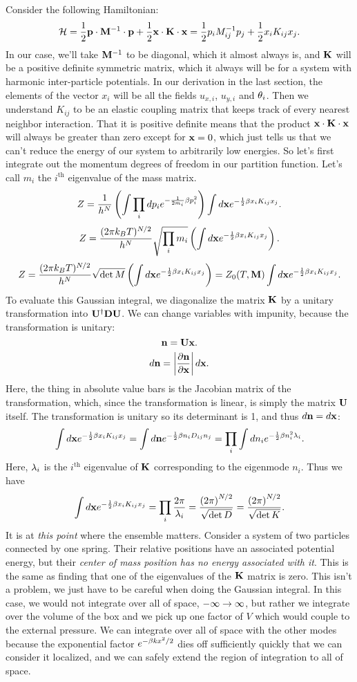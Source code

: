 \documentclass[12pt]{article}
\begin{document}
Consider the following Hamiltonian:
\[\mathcal{H} = \frac{1}{2} \mathbf{p} \cdot \mathbf{M} ^{-1} \cdot \mathbf{p} + \frac{1}{2} \mathbf{x} \cdot \mathbf{K} \cdot \mathbf{x} = \frac{1}{2}p_i M^{-1}_{ij} p_j + \frac{1}{2}x_i K_{ij}x_j.\]
In our case, we'll take $\mathbf{M}^{-1}$ to be diagonal, which it almost always is, and $\mathbf{K}$ will be a positive definite symmetric matrix, which it always will be for a system with harmonic inter-particle potentials. In our derivation in the last section, the elements of the vector $x_i$ will be all the fields $u_{x,i}$, $u_{y,i}$ and $\theta_i$. Then we understand $K_{ij}$ to be an elastic coupling matrix that keeps track of every nearest neighbor interaction. That it is positive definite means that the product $\mathbf{x} \cdot \mathbf{K} \cdot \mathbf{x}$ will always be greater than zero except for $\mathbf{x} = 0$, which just tells us that we can't reduce the energy of our system to arbitrarily low energies. So let's first integrate out the momentum degrees of freedom in our partition function. Let's call $m_i$ the $i^\mathrm{th}$ eigenvalue of the mass matrix.
\[ Z = \frac{1}{h^N} \left(\int \prod_idp_i e^{-\frac{1}{2m_i}\beta p_i^2}\right)\int d\mathbf{x} e^{-\frac{1}{2}\beta x_iK_{ij}x_j}.\]
\[ Z = \frac{(2\pi k_BT)^{N/2}}{h^N}\sqrt{\prod_i m_i} \left(\int d\mathbf{x} e^{-\frac{1}{2}\beta x_iK_{ij}x_j}\right).\]
\[ Z = \frac{(2\pi k_BT)^{N/2}}{h^N}\sqrt{\det M} \left(\int d\mathbf{x} e^{-\frac{1}{2}\beta x_iK_{ij}x_j}\right) = Z_0(T,\mathbf{M}) \int d\mathbf{x} e^{-\frac{1}{2}\beta x_iK_{ij}x_j}.\]
To evaluate this Gaussian integral, we diagonalize the matrix $\mathbf{K}$ by a unitary transformation into $\mathbf{U}^\dagger \mathbf{D} \mathbf{U}$. We can change variables with impunity, because the transformation is unitary:
\[ \mathbf{n} = \mathbf{U} \mathbf{x}.\]
\[ d\mathbf{n} = \left | \frac{\partial {\mathbf{n}}}{\partial {\mathbf{x}}} \right | d\mathbf{x}.\]
Here, the thing in absolute value bars is the Jacobian matrix of the transformation, which, since the transformation is linear, is simply the matrix $\mathbf{U}$ itself. The transformation is unitary so its determinant is 1, and thus $d\mathbf{n} = d\mathbf{x}$:
\[ \int d\mathbf{x} e^{-\frac{1}{2}\beta x_i K_{ij} x_j} = \int d\mathbf{n} e^{-\frac{1}{2}\beta n_i D_{ij} n_j} = \prod_i \int dn_i e^{-\frac{1}{2} \beta n_i^2 \lambda_i}.\]
Here, $\lambda_i$ is the $i^\mathrm{th}$ eigenvalue of $\mathbf{K}$ corresponding to the eigenmode $n_i$. Thus we have
\[ \int d\mathbf{x} e^{-\frac{1}{2}\beta x_i K_{ij} x_j} = \prod_i \frac{2\pi}{\lambda_i} = \frac{\left(2\pi\right)^{N/2}}{\sqrt{\det D}} = \frac{\left(2\pi\right)^{N/2}}{\sqrt{\det K}}.\]
It is at \emph{this point} where the ensemble matters. Consider a system of two particles connected by one spring. Their relative positions have an associated potential energy, but their \emph{center of mass position has no energy associated with it}. This is the same as finding that one of the eigenvalues of the $\mathbf{K}$ matrix is zero. This isn't a problem, we just have to be careful when doing the Gaussian integral. In this case, we would not integrate over all of space, $-\infty \rightarrow \infty$, but rather we integrate over the volume of the box and we pick up one factor of $V$ which would couple to the external pressure. We can integrate over all of space with the other modes because the exponential factor $e^{-\beta k x^2/2}$ dies off sufficiently quickly that we can consider it localized, and we can safely extend the region of integration to all of space.
\end{document}
